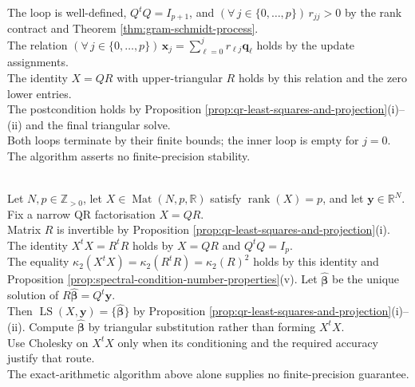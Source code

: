 The loop is well-defined, $Q^tQ=I_{p+1}$, and $(\forall\,j\in\{0,\ldots,p\})\,r_{jj}>0$ by the rank contract and Theorem \ref{thm:gram-schmidt-process}.\\
The relation $(\forall\,j\in\{0,\ldots,p\})\,\mathbf{x}_j=\sum\limits_{\ell=0}^{j}r_{\ell j}\mathbf{q}_{\ell}$ holds by the update assignments.\\
The identity $X=QR$ with upper-triangular $R$ holds by this relation and the zero lower entries.\\
The postcondition holds by Proposition \ref{prop:qr-least-squares-and-projection}(i)--(ii) and the final triangular solve.\\
Both loops terminate by their finite bounds; the inner loop is empty for $j=0$. The algorithm asserts no finite-precision stability.

\begin{perspective} \label{per:linear-model-numerical-solution-route} \\
Let $N,p\in\mathbb{Z}_{>0}$, let $X\in\operatorname{Mat}(N,p,\mathbb{R})$ satisfy $\operatorname{rank}(X)=p$, and let $\mathbf{y}\in\mathbb{R}^N$. Fix a narrow QR factorisation $X=QR$.\\
Matrix $R$ is invertible by Proposition \ref{prop:qr-least-squares-and-projection}(i). The identity $X^tX=R^tR$ holds by $X=QR$ and $Q^tQ=I_p$.\\
The equality $\kappa_2(X^tX)=\kappa_2(R^tR)=\kappa_2(R)^2$ holds by this identity and Proposition \ref{prop:spectral-condition-number-properties}(v). Let $\widehat{\boldsymbol{\beta}}$ be the unique solution of $R\widehat{\boldsymbol{\beta}}=Q^t\mathbf{y}$.\\
Then $\operatorname{LS}(X,\mathbf{y})=\{\widehat{\boldsymbol{\beta}}\}$ by Proposition \ref{prop:qr-least-squares-and-projection}(i)--(ii). Compute $\widehat{\boldsymbol{\beta}}$ by triangular substitution rather than forming $X^tX$.\\
Use Cholesky on $X^tX$ only when its conditioning and the required accuracy justify that route.\\
The exact-arithmetic algorithm above alone supplies no finite-precision guarantee.
\end{perspective}
